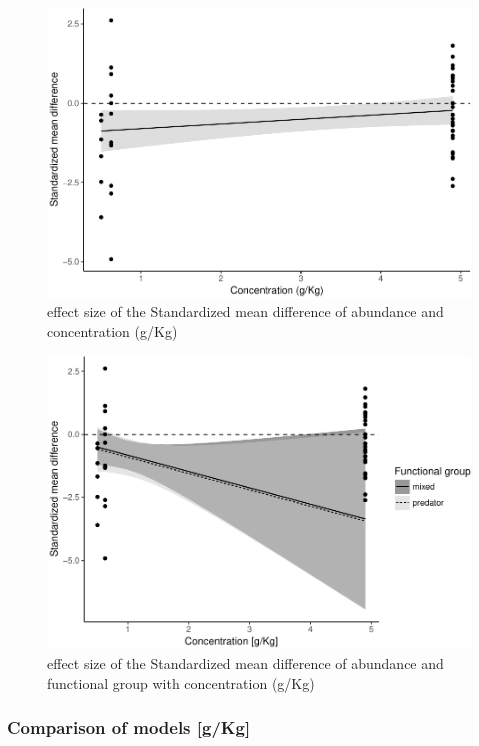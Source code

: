 \documentclass[]{elsarticle} %
\makeatletter
\def\maxwidth{\ifdim\Gin@nat@width>\linewidth\linewidth
\else\Gin@nat@width\fi}
\let\Oldincludegraphics\includegraphics
\renewcommand{\includegraphics}[1]{\Oldincludegraphics[width=\maxwidth]{#1}}
\makeatother
\begin{document}
\begin{figure}[htbp]
\centering
\includegraphics{MetanalysisNeonics_files/figure-latex/unnamed-chunk-11-1.pdf}
\caption{effect size of the Standardized mean difference of abundance
and concentration (g/Kg)}
\end{figure}

\begin{figure}[htbp]
\centering
\includegraphics{MetanalysisNeonics_files/figure-latex/unnamed-chunk-12-1.pdf}
\caption{effect size of the Standardized mean difference of abundance
and functional group with concentration (g/Kg)}
\end{figure}

\subsubsection{Comparison of models
{[}g/Kg{]}}\label{comparison-of-models-gkg}
\end{document}
